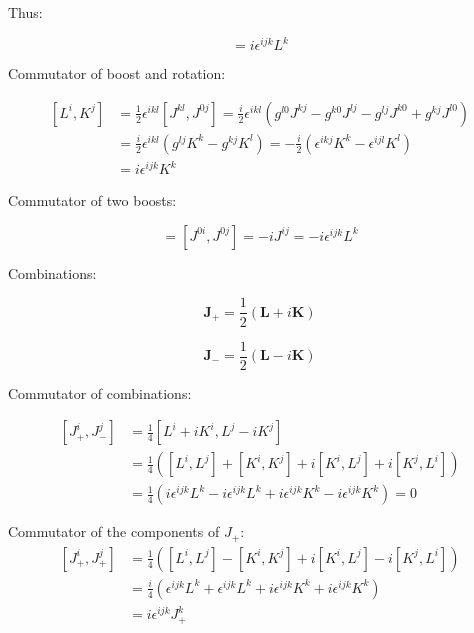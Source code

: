 \documentclass[11pt]{article}
\begin{document}
Thus:

\begin{equation}
[ L^i, L^j ] = i \epsilon^{ijk} L^k
\end{equation}

\pagebreak

Commutator of boost and rotation:

\begin{equation}
\begin{split}
[ L^i, K^j ] & = \frac{1}{2} \epsilon^{ikl} [ J^{kl}, J^{0j} ] =
  \frac{i}{2} \epsilon^{ikl} \left(
    g^{l0} J^{kj} - g^{k0} J^{lj} - g^{lj} J^{k0} + g^{kj} J^{l0}
  \right) \\
& = \frac{i}{2} \epsilon^{ikl}
  \left( g^{lj} K^k - g^{kj} K^l \right) =
  -\frac{i}{2}
  \left( \epsilon^{ikj} K^k - \epsilon^{ijl} K^l \right) \\
& = i \epsilon^{ijk} K^k
\end{split}
\end{equation}

Commutator of two boosts:

\begin{equation}
[ K^i, K^j ] = [ J^{0i}, J^{0j} ] =
-i J^{ij} = - i \epsilon^{ijk} L^k
\end{equation}

Combinations:

\begin{equation}
\mathbf{J}_+ = \frac{1}{2} \left( \mathbf{L} + i \mathbf{K} \right)
\end{equation}

\begin{equation}
\mathbf{J}_- = \frac{1}{2} \left( \mathbf{L} - i \mathbf{K} \right)
\end{equation}

Commutator of combinations:

\begin{equation}
\begin{split}
[ J_+^i, J_-^j ] & = \frac{1}{4} [ L^i + i K^i, L^j - i K^j ] \\
& = \frac{1}{4} \left( [ L^i, L^j ] + [ K^i, K^j ] +
  i [ K^i, L^j ] + i [ K^j, L^i ] \right) \\
& = \frac{1}{4} \left(
  i \epsilon^{ijk} L^k - i \epsilon^{ijk} L^k +
  i \epsilon^{ijk} K^k - i \epsilon^{ijk} K^k \right) = 0
\end{split}
\end{equation}

Commutator of the components of $J_+$:
\begin{equation}
\begin{split}
[ J_+^i, J_+^j ] & = \frac{1}{4} \left( [ L^i, L^j ] - [ K^i, K^j ] +
  i [ K^i, L^j ] - i [ K^j, L^i ] \right) \\
& = \frac{i}{4} \left(
  \epsilon^{ijk} L^k + \epsilon^{ijk} L^k + i \epsilon^{ijk} K^k +
  i \epsilon^{ijk} K^k
\right) \\
& = i \epsilon^{ijk} J_+^k
\end{split}
\end{equation}
\end{document}
